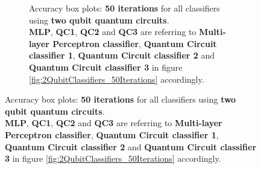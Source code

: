 \begin{figure}[!h]
\begin{subfigure}{1.0\textwidth}
\begin{subfigure}{1.0\textwidth}
{            }
        \end{subfigure}
        \begin{subfigure}{1.0\textwidth}
            \centering
        \end{subfigure}
        \begin{subfigure}{1.0\textwidth}
            \centering
        \end{subfigure}
        \caption{Accuracy box plots: \textbf{50 iterations} for all classifiers using \textbf{two qubit quantum circuits}.\\ \textbf{MLP}, \textbf{QC1}, \textbf{QC2} and \textbf{QC3} are referring to \textbf{Multi-layer Perceptron classifier}, \textbf{Quantum Circuit classifier 1}, \textbf{Quantum Circuit classifier 2} and \textbf{Quantum Circuit classifier 3} in figure \ref{fig:2QubitClassifiers_50Iterations} accordingly.}
        \label{fig:2QubitClassifiers_50Iterations_boxplot}
    \end{subfigure}
\end{figure}

